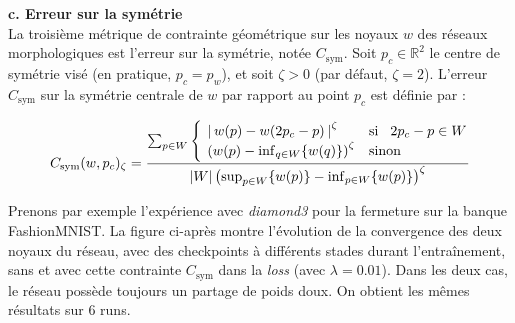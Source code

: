 \noindent \textbf{c. Erreur sur la symétrie}\\

La troisième métrique de contrainte géométrique sur les noyaux $w$ des réseaux morphologiques est l'erreur sur la symétrie, notée $C_\text{sym}$. Soit $p_c \in \mathbb{R}^2$ le centre de symétrie visé (en pratique, $p_c = p_w$), et soit $\zeta > 0$ (par défaut, $\zeta = 2$). L'erreur $C_\text{sym}$ sur la symétrie centrale de $w$ par rapport au point $p_c$ est définie par :

\vspace{2.0mm}
\begin{equation}
    C_\text{sym}(w, p_c)_\zeta = 
    \frac{ 
    \sum_{p \in W} 
    \begin{cases}
        \hspace{1.4mm} \left | \hspace{0.7mm} w(p) - w( 2 p_c - p ) \hspace{0.7mm} \right | ^\zeta & \mbox{si} \hspace{3mm} 2 p_c - p \in W \\
        \hspace{1.4mm} \left ( w(p) - \inf_{q \in W} \{ w(q) \} \right ) ^\zeta & \mbox{sinon}
    \end{cases}
    }
    { |W| \left ( \sup_{p \in W} \{ w(p) \} - \inf_{p \in W} \{ w(p) \} \right ) ^\zeta }
    \label{erreur_sym}
\end{equation}

\vspace{4.5mm}
\noindent Prenons par exemple l'expérience avec \textit{diamond3} pour la fermeture sur la banque FashionMNIST. La figure ci-après montre l'évolution de la convergence des deux noyaux du réseau, avec des checkpoints à différents stades durant l'entraînement, sans et avec cette contrainte $C_\text{sym}$ dans la \textit{loss} (avec $\lambda = 0.01$). Dans les deux cas, le réseau possède toujours un partage de poids doux. On obtient les mêmes résultats sur 6 runs. \\


